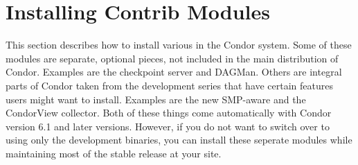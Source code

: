 \section{\label{sec:Contrib-Install}Installing Contrib Modules}

This section describes how to install various 
in the Condor system.
Some of these modules are separate, optional pieces, not included in
the main distribution of Condor.
Examples are the checkpoint server and DAGMan.
Others are integral parts of Condor taken from the development series
that have certain features users might want to install.
Examples are the new SMP-aware  and the CondorView
collector.  
Both of these things come automatically with Condor version 6.1 and
later versions.
However, if you do not want to switch over to using only the
development binaries, you can install these seperate modules
while
maintaining most of the stable release at your site.










